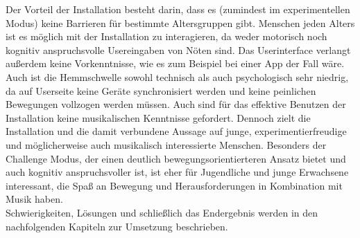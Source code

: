 
Der Vorteil der Installation besteht darin, dass es (zumindest im experimentellen Modus) keine Barrieren für bestimmte Altersgruppen gibt. Menschen jeden Alters ist es möglich mit der Installation zu interagieren, da weder motorisch noch kognitiv anspruchsvolle Usereingaben von Nöten sind. Das Userinterface verlangt außerdem keine Vorkenntnisse, wie es zum Beispiel bei einer App der Fall wäre. Auch ist die Hemmschwelle sowohl technisch als auch psychologisch sehr niedrig, da auf Userseite keine Geräte synchronisiert werden und keine peinlichen Bewegungen vollzogen werden müssen. Auch sind für das effektive Benutzen der Installation keine musikalischen Kenntnisse gefordert.
Dennoch zielt die Installation und die damit verbundene Aussage auf junge, experimentierfreudige und möglicherweise auch musikalisch interessierte Menschen. Besonders der Challenge Modus, der einen deutlich bewegungsorientierteren Ansatz bietet und auch kognitiv anspruchsvoller ist, ist eher für Jugendliche und junge Erwachsene interessant, die Spaß an Bewegung und Herausforderungen in Kombination mit Musik haben.\\
Schwierigkeiten, Lösungen und schließlich das Endergebnis werden in den nachfolgenden Kapiteln zur Umsetzung beschrieben.